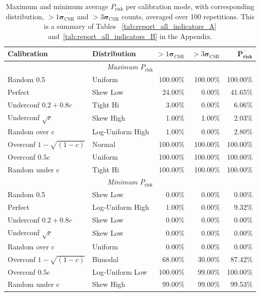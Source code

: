 \documentclass{article}
\theoremstyle{plain}
\theoremstyle{definition}
\theoremstyle{remark}
\begin{document}
\begin{table}[ht]
\centering
\footnotesize
\begin{tabular}{llrrr}
\toprule
\textbf{Calibration} & \textbf{Distribution} & $>1\boldsymbol{\sigma}_{\mathrm{CSR}}$ &  $>3\boldsymbol{\sigma}_{\mathrm{CSR}}$ & $\overline{\textbf{P}_{\textbf{risk}}}$ \\
\midrule
\multicolumn{5}{c}{\textit{Maximum $P_{\mathrm{risk}}$}} \\
\midrule
Random 0.5 & Uniform & 100.00\% & 100.00\% & 100.00\% \\
Perfect & Skew Low & 24.00\% & 0.00\% & 41.65\% \\
Underconf $0.2 + 0.8c$ & Tight Hi & 3.00\% & 0.00\% & 6.06\% \\
Underconf $\sqrt{c}$ & Skew High & 1.00\% & 1.00\% & 2.03\% \\
Random over c & Log-Uniform High & 1.00\% & 0.00\% & 2.80\% \\
Overconf  $1-\sqrt{(1-c)}$ & Normal & 100.00\% & 100.00\% & 100.00\% \\
Overconf $0.5c$  & Uniform & 100.00\% & 100.00\% & 100.00\% \\
Random under c & Tight Hi & 100.00\% & 100.00\% & 100.00\% \\
\midrule
\multicolumn{5}{c}{\textit{Minimum $P_{\mathrm{risk}}$}} \\
\midrule
Random 0.5 & Skew Low & 0.00\% & 0.00\% & 0.00\% \\
Perfect & Log-Uniform High & 1.00\% & 0.00\% & 9.32\% \\
Underconf $0.2 + 0.8c$ & Skew Low & 0.00\% & 0.00\% & 0.00\% \\
Underconf $\sqrt{c}$ & Skew Low & 0.00\% & 0.00\% & 0.00\% \\
Random over c & Uniform & 0.00\% & 0.00\% & 0.00\% \\
Overconf  $1-\sqrt{(1-c)}$ & Bimodal & 68.00\% & 30.00\% & 87.42\% \\
Overconf $0.5c$  & Log-Uniform Low & 100.00\% & 99.00\% & 100.00\% \\
Random under c & Skew High & 99.00\% & 99.00\% & 99.53\% \\
\bottomrule
\end{tabular}
\caption{Maximum and minimum average $P_{\mathrm{risk}}$ per calibration mode, with corresponding distribution, $>1\boldsymbol{\sigma}_{\mathrm{CSR}}$ and $>3\boldsymbol{\sigma}_{\mathrm{CSR}}$ counts, averaged over 100 repetitions. This is a summary of Tables ~\ref{tab:report_all_indicators_A} and~\ref{tab:report_all_indicators_B} in the Appendix.}
\label{tab:prisk_extremes}
\end{table}
\end{document}

